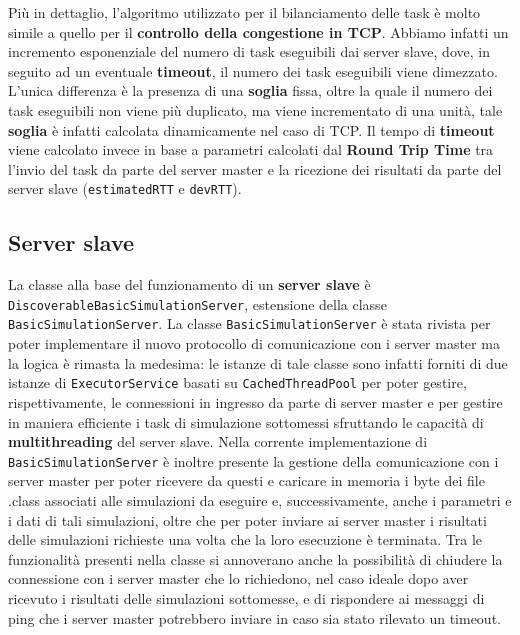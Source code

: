 Più in dettaglio, l'algoritmo utilizzato per il bilanciamento delle task è molto simile a quello per il \textbf{controllo della congestione in TCP}. Abbiamo infatti un incremento esponenziale del numero di task eseguibili dai server slave, dove, in seguito ad un eventuale \textbf{timeout}, il numero dei task eseguibili viene dimezzato. L'unica differenza è la presenza di una \textbf{soglia} fissa, oltre la quale il numero dei task eseguibili non viene più duplicato, ma viene incrementato di una unità, tale \textbf{soglia} è infatti calcolata dinamicamente nel caso di TCP. Il tempo di \textbf{timeout} viene calcolato invece in base a parametri calcolati dal \textbf{Round Trip Time} tra l'invio del task da parte del server master e la ricezione dei risultati da parte del server slave (\texttt{estimatedRTT} e \texttt{devRTT}).

\subsection{Server slave}
La classe alla base del funzionamento di un \textbf{server slave} è \texttt{DiscoverableBasicSimulationServer}, estensione della classe \texttt{BasicSimulationServer}.
La classe \texttt{BasicSimulationServer} è stata rivista per poter implementare il nuovo protocollo di comunicazione con i server master ma la logica è rimasta la medesima:
le istanze di tale classe sono infatti forniti di due istanze di \texttt{ExecutorService} basati su \texttt{CachedThreadPool} per poter gestire, rispettivamente, le connessioni in ingresso da parte di server master
e per gestire in maniera efficiente i task di simulazione sottomessi sfruttando le capacità di \textbf{multithreading} del server slave.
Nella corrente implementazione di \texttt{BasicSimulationServer} è inoltre presente la gestione della comunicazione con i server master per poter ricevere da questi e caricare in memoria i byte dei file .class associati
alle simulazioni da eseguire e, successivamente, anche i parametri e i dati di tali simulazioni, oltre che per poter inviare ai server master i risultati delle simulazioni richieste una volta che la loro esecuzione è terminata.
Tra le funzionalità presenti nella classe si annoverano anche la possibilità di chiudere la connessione con i server master che lo richiedono, nel caso ideale dopo aver ricevuto i risultati delle simulazioni sottomesse,
e di rispondere ai messaggi di ping che i server master potrebbero inviare in caso sia stato rilevato un timeout. 

